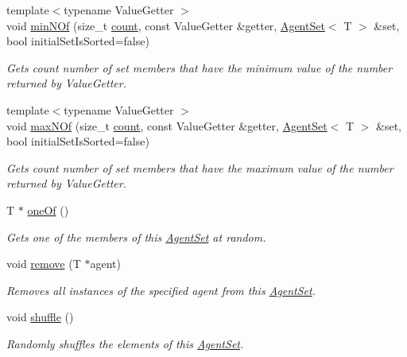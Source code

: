 \begin{DoxyCompactItemize}
{\footnotesize template$<$typename Value\-Getter $>$ }\\void \hyperlink{classrepast_1_1relogo_1_1_agent_set_a7c148ed677ad6f2f1db3d56fd644adf2}{min\-N\-Of} (size\-\_\-t \hyperlink{classrepast_1_1relogo_1_1_agent_set_aa3a44b933b292416299f4da0ce39d0ae}{count}, const Value\-Getter \&getter, \hyperlink{classrepast_1_1relogo_1_1_agent_set}{Agent\-Set}$<$ T $>$ \&set, bool initial\-Set\-Is\-Sorted=false)
\begin{DoxyCompactList}\small\item\em Gets count number of set members that have the minimum value of the number returned by Value\-Getter. \end{DoxyCompactList}\item 
{\footnotesize template$<$typename Value\-Getter $>$ }\\void \hyperlink{classrepast_1_1relogo_1_1_agent_set_ae572019108c57f8a8d4e9dcd5feddd42}{max\-N\-Of} (size\-\_\-t \hyperlink{classrepast_1_1relogo_1_1_agent_set_aa3a44b933b292416299f4da0ce39d0ae}{count}, const Value\-Getter \&getter, \hyperlink{classrepast_1_1relogo_1_1_agent_set}{Agent\-Set}$<$ T $>$ \&set, bool initial\-Set\-Is\-Sorted=false)
\begin{DoxyCompactList}\small\item\em Gets count number of set members that have the maximum value of the number returned by Value\-Getter. \end{DoxyCompactList}\item 
T $\ast$ \hyperlink{classrepast_1_1relogo_1_1_agent_set_a86c9434e990506cc04975062eaa9235c}{one\-Of} ()
\begin{DoxyCompactList}\small\item\em Gets one of the members of this \hyperlink{classrepast_1_1relogo_1_1_agent_set}{Agent\-Set} at random. \end{DoxyCompactList}\item 
\hypertarget{classrepast_1_1relogo_1_1_agent_set_a71cc2d2b676bce1728d3e8a7a9d2a96a}{void \hyperlink{classrepast_1_1relogo_1_1_agent_set_a71cc2d2b676bce1728d3e8a7a9d2a96a}{remove} (T $\ast$agent)}\label{classrepast_1_1relogo_1_1_agent_set_a71cc2d2b676bce1728d3e8a7a9d2a96a}

\begin{DoxyCompactList}\small\item\em Removes all instances of the specified agent from this \hyperlink{classrepast_1_1relogo_1_1_agent_set}{Agent\-Set}. \end{DoxyCompactList}\item 
\hypertarget{classrepast_1_1relogo_1_1_agent_set_ab3ba8ae249e8b09b37b5f5005c725ce1}{void \hyperlink{classrepast_1_1relogo_1_1_agent_set_ab3ba8ae249e8b09b37b5f5005c725ce1}{shuffle} ()}\label{classrepast_1_1relogo_1_1_agent_set_ab3ba8ae249e8b09b37b5f5005c725ce1}

\begin{DoxyCompactList}\small\item\em Randomly shuffles the elements of this \hyperlink{classrepast_1_1relogo_1_1_agent_set}{Agent\-Set}. \end{DoxyCompactList}\end{DoxyCompactItemize}
